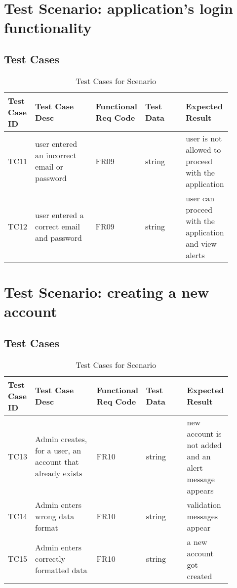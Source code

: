 \documentclass[12pt]{article}
\begin{document}
\section{Test Scenario: application's login functionality}\label{sec:TSy}
\subsection{Test Cases}
\begin{table}[h]
\caption{Test Cases for Scenario}
\label{tab:TC1}
\begin{tabular}{|p{0.1\linewidth}|p{0.3\linewidth}|p{0.1\linewidth}|p{0.2\linewidth}|p{0.2\linewidth}|}
\hline
Test Case ID & Test Case Desc & Functional Req Code & Test Data & Expected Result \\ \hline
TC11  & user entered an incorrect email or password & FR09 & string   & user is not allowed to proceed with the application               \\ \hline
TC12 & user entered a correct email and password   & FR09    &  string      &  user can proceed with the application and view alerts          \\ \hline

\end{tabular}
\end{table}
\newpage
\section{Test Scenario: creating a new account}\label{sec:TSy}
\subsection{Test Cases}
\begin{table}[h]
\caption{Test Cases for Scenario}
\label{tab:TC1}
\begin{tabular}{|p{0.1\linewidth}|p{0.3\linewidth}|p{0.1\linewidth}|p{0.2\linewidth}|p{0.2\linewidth}|}
\hline
Test Case ID & Test Case Desc & Functional Req Code & Test Data & Expected Result \\ \hline
TC13  & Admin creates, for a user, an account that already exists & FR10 & string   & new account is not added and an alert message appears               \\ \hline
TC14 & Admin enters wrong data format   & FR10    &  string      &  validation messages appear         \\ \hline
TC15 & Admin enters correctly formatted data   & FR10    &  string      &  a new account got created         \\ \hline

\end{tabular}
\end{table}
\end{document}
